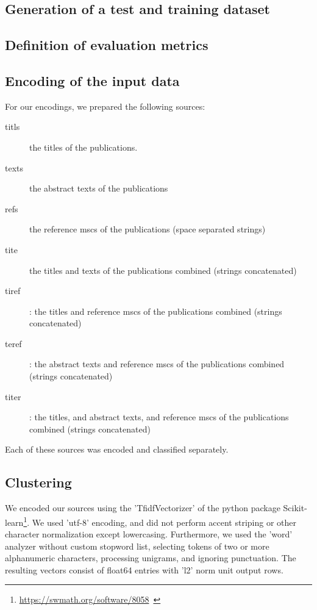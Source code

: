 \subsection{Generation of a test and training dataset}
\subsection{Definition of evaluation metrics}
\subsection{Encoding of the input data}


For our encodings, we prepared the following sources:

\begin{description}
  \item[titls] the titles of the publications.
  \item[texts] the abstract texts of the publications
  \item[refs] the reference mscs of the publications (space separated strings)
  \item[tite] the titles and texts of the publications combined (strings concatenated)
  \item[tiref]: the titles and reference mscs of the publications combined (strings concatenated)
  \item[teref]: the abstract texts and reference mscs of the publications combined (strings concatenated)
  \item[titer]: the titles, and abstract texts, and reference mscs of the publications combined (strings concatenated)
\end{description}





Each of these sources was encoded and classified separately.
\subsection{Clustering}

We encoded our sources using the 'TfidfVectorizer' of the python package Scikit-learn\footnote{\url{https://swmath.org/software/8058}~\cite{swSciKit}}. We used 'utf-8' encoding, and did not perform accent striping or other character normalization except lowercasing. Furthermore, we used the 'word' analyzer without custom stopword list, selecting tokens of two or more alphanumeric characters, processing unigrams, and ignoring punctuation. The resulting vectors consist of float64 entries with 'l2' norm unit output rows.



